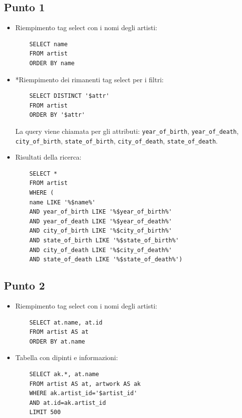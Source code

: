 \documentclass{ol-softwaremanual}
\begin{document}
\subsection{Punto 1}
\begin{itemize}
    \item Riempimento tag select con i nomi degli artisti:
    \begin{verbatim}
    SELECT name
    FROM artist
    ORDER BY name
    \end{verbatim}
    \item *Riempimento dei rimanenti tag select per i filtri:
    \begin{verbatim}
    SELECT DISTINCT '$attr'
    FROM artist
    ORDER BY '$attr'
    \end{verbatim}
    La query viene chiamata per gli attributi: \verb|year_of_birth|, \verb|year_of_death|,
    \verb|city_of_birth|, \verb|state_of_birth|, \verb|city_of_death|, \verb|state_of_death|.
    \item Risultati della ricerca:
    \begin{verbatim}
    SELECT *
    FROM artist
    WHERE (
    name LIKE '%$name%' 
    AND year_of_birth LIKE '%$year_of_birth%'
    AND year_of_death LIKE '%$year_of_death%'
    AND city_of_birth LIKE '%$city_of_birth%' 
    AND state_of_birth LIKE '%$state_of_birth%' 
    AND city_of_death LIKE '%$city_of_death%' 
    AND state_of_death LIKE '%$state_of_death%')
    \end{verbatim}
\end{itemize}

\subsection{Punto 2}
\begin{itemize}
    \item Riempimento tag select con i nomi degli artisti:
    \begin{verbatim}
    SELECT at.name, at.id 
    FROM artist AS at 
    ORDER BY at.name
    \end{verbatim}
    \item Tabella con dipinti e informazioni:
    \begin{verbatim}
    SELECT ak.*, at.name 
    FROM artist AS at, artwork AS ak
    WHERE ak.artist_id='$artist_id'
    AND at.id=ak.artist_id
    LIMIT 500
    \end{verbatim}
\end{itemize}
\end{document}
